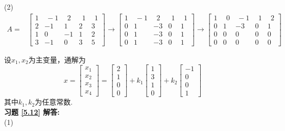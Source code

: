 (2)
\begin{displaymath}
\begin{aligned}
A=&\begin{bmatrix}1&\ -1&\ \ 2&\ \ 1&\ \ 1\\2&-1&1&2&3\\1&0&-1&1&2\\3&-1&0&3&5  \end{bmatrix}\rightarrow
\begin{bmatrix}1&\ -1&\ \ 2&\ \ 1&\ \ 1\\0&1&-3&0&1\\0&1&-3&0&1\\0&1&-3&0&1  \end{bmatrix}\rightarrow
\begin{bmatrix}1&\ \ 0&\ -1&\ \ 1&\ \ 2\\0&1&-3&0&1\\0&0&0&0&0\\0&0&0&0&0  \end{bmatrix}
\end{aligned} \end{displaymath}

设$x_1,x_2$为主变量，通解为
\begin{displaymath}
x=\begin{bmatrix}x_1\\x_2\\x_3\\x_4\end{bmatrix}=\begin{bmatrix}2\\1\\0\\0\end{bmatrix}
+k_1\begin{bmatrix}1\\3\\1\\0\end{bmatrix}+k_2\begin{bmatrix}-1\\0\\0\\1\end{bmatrix}
\end{displaymath}
其中$k_1,k_2$为任意常数.\\
\textbf{习题 \ref{5.12} 解答:}\\
(1)

